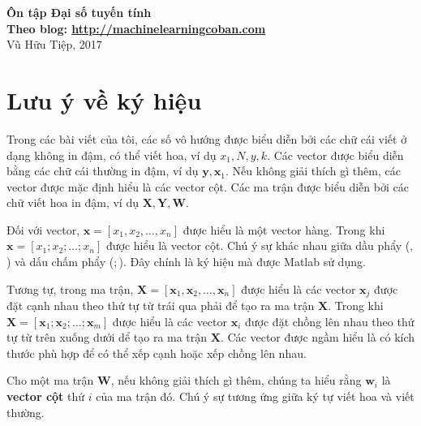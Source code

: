 \documentclass[12pt]{article}
\begin{document}
 \begin{center}
  \textbf{\Huge Ôn tập Đại số tuyến tính}\\ 
  \vspace{.25cm}
\small{\bf Theo blog: \url{http://machinelearningcoban.com}
}\\
\vspace{.5cm}
  Vũ Hữu Tiệp, 2017
\end{center}

 
 

\section{Lưu ý về ký hiệu}
 
Trong các bài viết của tôi, các số vô hướng được biểu diễn bởi các chữ cái viết ở dạng không in đậm, có thể viết hoa, ví dụ $x_1, N, y, k$. Các vector được biểu diễn bằng các chữ cái thường in đậm, ví dụ $\mathbf{y}, \mathbf{x}_1 $. Nếu không giải thích gì thêm, các vector được mặc định hiểu là các vector cột. Các ma trận được biểu diễn bởi các chữ viết hoa in đậm, ví dụ $\mathbf{X, Y, W} $. 
 
Đối với vector, $\mathbf{x} = [x_1, x_2, \dots, x_n]$ được hiểu là một vector hàng. Trong khi $\mathbf{x} = [x_1; x_2; \dots; x_n] $ được hiểu là vector cột. Chú ý sự khác nhau giữa dầu phẩy ($,$) và dấu chấm phẩy ($;$). Đây chính là ký hiệu mà được Matlab sử dụng. 
 
Tương tự, trong ma trận, $\mathbf{X} = [\mathbf{x}_1, \mathbf{x}_2, \dots, \mathbf{x}_n]$ được hiểu là các vector $\mathbf{x}_j$ được đặt cạnh nhau theo thứ tự từ trái qua phải để tạo ra ma trận $\mathbf{X}$. Trong khi $\mathbf{X} = [\mathbf{x}_1; \mathbf{x}_2; \dots; \mathbf{x}_m]$ được hiểu là các vector $\mathbf{x}_i$ được đặt chồng lên nhau theo thứ tự từ trên xuống dưới dể tạo ra ma trận $\mathbf{X}$. Các vector được ngầm hiểu là có kích thước phù hợp để có thể xếp cạnh hoặc xếp chồng lên nhau. 
 
Cho một ma trận $\mathbf{W}$, nếu không giải thích gì thêm, chúng ta hiểu rằng $\mathbf{w}_i$ là \textbf{vector cột} thứ $i$ của ma trận đó. Chú ý sự tương ứng giữa ký tự viết hoa và viết thường. 
 
\end{document}
